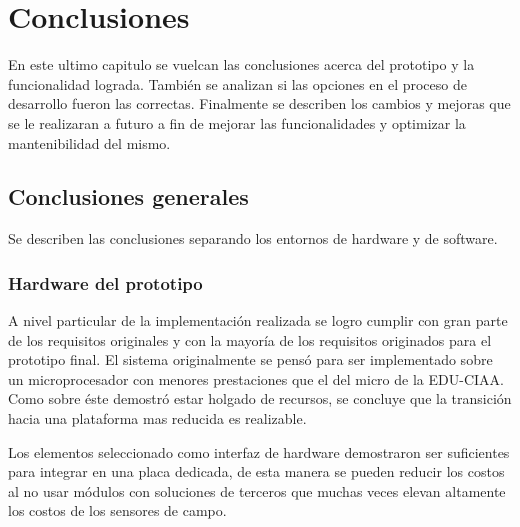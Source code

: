 \chapter{ Conclusiones }
\label{Chapter5} 
En este ultimo capitulo se vuelcan las conclusiones acerca del prototipo y la funcionalidad lograda. También se analizan si las opciones en el proceso de desarrollo fueron las correctas. Finalmente se describen los cambios y mejoras que se le realizaran a futuro a fin de mejorar las funcionalidades y optimizar la mantenibilidad del mismo. 

\section{ Conclusiones generales }

Se describen las conclusiones separando los entornos de hardware y de software. 

\subsection{ Hardware del prototipo }
A nivel particular de la implementación realizada se logro cumplir con gran parte de los requisitos originales y con la mayoría de los requisitos originados para el prototipo final. 
El sistema originalmente se pensó para ser implementado sobre un microprocesador con menores prestaciones que el del micro de la EDU-CIAA. Como sobre éste demostró estar holgado de recursos, se concluye que la transición hacia una plataforma mas reducida es realizable.

Los elementos seleccionado como interfaz de hardware demostraron ser suficientes para integrar en una placa dedicada, de esta manera se pueden reducir los costos al no usar módulos con soluciones de terceros que muchas veces elevan altamente los costos de los sensores de campo.

